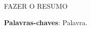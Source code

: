 \begin{resumo}
FAZER O RESUMO

 \vspace{\onelineskip}
    
 \noindent
 \textbf{Palavras-chaves}: Palavra.
\end{resumo}
